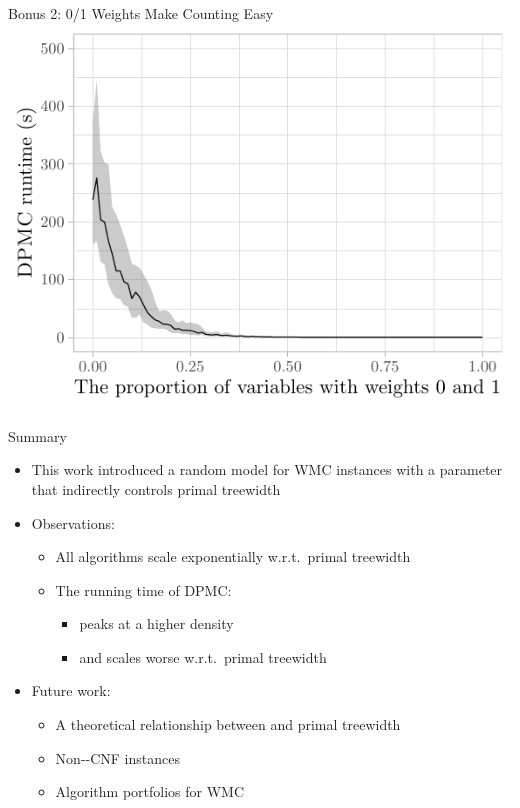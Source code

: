 \documentclass{beamer}
\begin{document}
\begin{frame}{Bonus 2: 0/1 Weights Make Counting Easy}
  \centering
  \includegraphics{delta}
\end{frame}

\begin{frame}{Summary}
  \begin{itemize}
    \item This work introduced a \alert{random model} for WMC instances with a
          parameter that indirectly controls \alert{primal treewidth}
    \item Observations:
    \begin{itemize}
      \item All algorithms \alert{scale exponentially} w.r.t.\ primal treewidth
      \item The running time of \textsc{DPMC}:
      \begin{itemize}
        \item peaks at a higher density
        \item and scales worse w.r.t.\ primal treewidth
      \end{itemize}
    \end{itemize}
    \item Future work:
    \begin{itemize}
      \item A theoretical relationship between \structure{$\rho$} and primal treewidth
      \item Non--CNF instances
      \item Algorithm portfolios for WMC
    \end{itemize}
  \end{itemize}
\end{frame}
\end{document}
